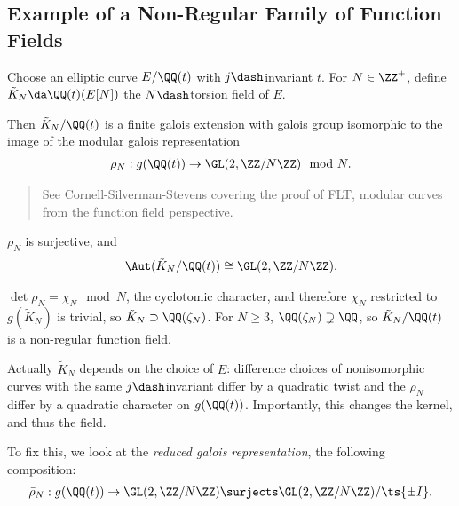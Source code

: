 \hypertarget{example-of-a-non-regular-family-of-function-fields}{%
\subsection{Example of a Non-Regular Family of Function
Fields}\label{example-of-a-non-regular-family-of-function-fields}}

Choose an elliptic curve \(E/\QQ(t)\) with \(j\dash\)invariant \(t\).
For \(N\in \ZZ^{+}\), define \(\tilde K_N \da \QQ(t)(E[N])\) the
\(N\dash\)torsion field of \(E\).

Then \(\tilde K_N/\QQ(t)\) is a finite galois extension with galois
group isomorphic to the image of the modular galois representation
\begin{align*}  
\rho_N: g(\QQ(t)) \to \GL(2, \ZZ/N\ZZ) \mod N
.\end{align*}

\begin{quote}
See Cornell-Silverman-Stevens covering the proof of FLT, modular curves
from the function field perspective.
\end{quote}

\begin{proposition}

\(\rho_N\) is surjective, and
\begin{align*}  
\Aut(\tilde K_N / \QQ(t))  \cong \GL(2, \ZZ/N\ZZ)
.\end{align*}

\(\det \rho_N = \chi_N \mod N\), the cyclotomic character, and therefore
\(\chi_N\) restricted to \(g(\tilde K_N)\) is trivial, so
\(\tilde K_N \supset \QQ(\zeta_N)\). For \(N\geq 3\),
\(\QQ(\zeta_N) \supsetneq \QQ\), so \(\tilde K_N / \QQ(t)\) is a
non-regular function field.

\end{proposition}

Actually \(\tilde K_N\) depends on the choice of \(E\): difference
choices of nonisomorphic curves with the same \(j\dash\)invariant differ
by a quadratic twist and the \(\rho_N\) differ by a quadratic character
on \(g(\QQ(t))\). Importantly, this changes the kernel, and thus the
field.

To fix this, we look at the \emph{reduced galois representation}, the
following composition:
\begin{align*}  
\bar \rho_N: g(\QQ(t)) \to \GL(2, \ZZ/N\ZZ) \surjects \GL(2, \ZZ/N\ZZ)/\ts{\pm I}
.\end{align*}


